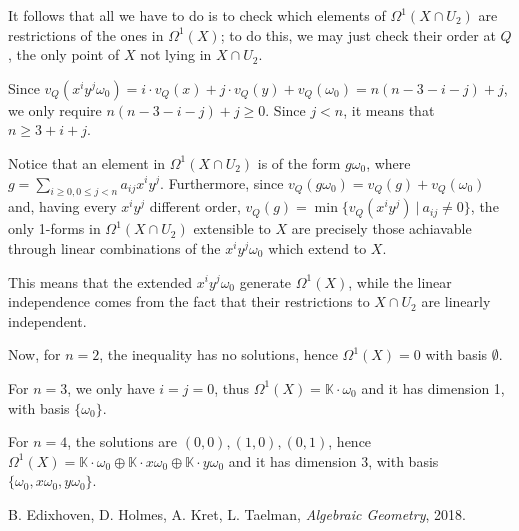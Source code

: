 \documentclass{article}
\newcommand{\numberset}{\mathbb}
\newcommand{\K}{\numberset{K}}
\begin{document}
It follows that all we have to do is to check which elements of $\Omega^1(X\cap U_2)$ are restrictions of the ones in $\Omega^1(X)$; to do this, we may just check their order at $Q$, the only point of $X$ not lying in $X\cap U_2$.

Since $v_Q(x^iy^j\omega_0)=i\cdot v_Q(x)+j\cdot v_Q(y)+v_Q(\omega_0)=n(n-3-i-j)+j$, we only require $n(n-3-i-j)+j\geq 0$. Since $j<n$, it means that $n\geq 3+i+j$.

Notice that an element in $\Omega^1(X\cap U_2)$ is of the form $g\omega_0$, where $g=\sum_{i\geq 0,0\leq j<n} a_{ij} x^iy^j$. Furthermore, since $v_Q(g\omega_0)=v_Q(g)+v_Q(\omega_0)$ and, having every $x^iy^j$ different order, $v_Q(g)=\min\{v_Q(x^iy^j)\ |\ a_{ij}\neq 0\}$, the only 1-forms in $\Omega^1(X\cap U_2)$ extensible to $X$ are precisely those achiavable through linear combinations of the $x^iy^j\omega_0$ which extend to $X$.

This means that the extended $x^iy^j\omega_0$ generate $\Omega^1(X)$, while the linear independence comes from the fact that their restrictions to $X\cap U_2$ are linearly independent.

Now, for $n=2$, the inequality has no solutions, hence $\Omega^1(X)=0$ with basis $\emptyset$.

For $n=3$, we only have $i=j=0$, thus $\Omega^1(X)=\K\cdot\omega_0$ and it has dimension 1, with basis $\{\omega_0\}$.

For $n=4$, the solutions are $(0,0),(1,0),(0,1)$, hence $\Omega^1(X)=\K\cdot\omega_0\oplus\K\cdot x\omega_0\oplus\K\cdot y\omega_0$ and it has dimension 3, with basis $\{\omega_0,x\omega_0,y\omega_0\}$.




\begin{thebibliography}{9}
	B. Edixhoven, D. Holmes, A. Kret, L. Taelman,
	\textit{Algebraic Geometry},
	2018.
\end{thebibliography}
\end{document}
